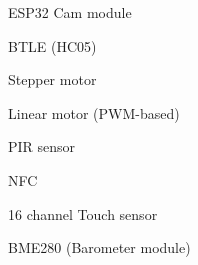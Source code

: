 
\begin{DoxyRefList}
\item[page \mbox{\hyperlink{index}{Ardu\+Forge\+: A library of classes to use with Arduino compatible microcontrollers (Uno/\+Nano/\+E\+S\+P32/...)}} ]\label{todo__todo000001}%
%
E\+S\+P32 Cam module 

\label{todo__todo000002}%
%
B\+T\+LE (H\+C05) 

\label{todo__todo000003}%
%
Stepper motor 

\label{todo__todo000004}%
%
Linear motor (P\+W\+M-\/based) 

\label{todo__todo000005}%
%
P\+IR sensor 

\label{todo__todo000006}%
%
N\+FC 

\label{todo__todo000007}%
%
16 channel Touch sensor 

\label{todo__todo000008}%
%
B\+M\+E280 (Barometer module)
\end{DoxyRefList}